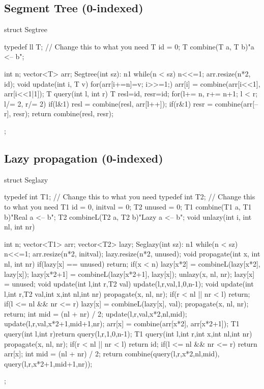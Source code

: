 \subsection{Segment Tree (0-indexed)}
\begin{cpp}
struct Segtree{
  typedef ll T; // Change this to what you need
  T id = 0;
  T combine(T a, T b){"a <-- b";}

  int n; vector<T> arr;
  Segtree(int sz): n{1} {
    while(n < sz) n<<=1; arr.resize(n*2, id);
  }
  void update(int i, T v){
    for(arr[i+=n]=v; i>>=1;)
      arr[i] = combine(arr[i<<1], arr[i<<1|1]);
  }
  T query(int l, int r){
    T resl=id, resr=id;
    for(l+= n, r+= n+1; l < r; l/= 2, r/= 2){
      if(l&1) resl = combine(resl, arr[l++]);
      if(r&1) resr = combine(arr[--r], resr);
    }
    return combine(resl, resr);
  }
};
\end{cpp}

\subsection{Lazy propagation (0-indexed)}
\begin{cpp}
struct Seglazy{
  typedef int T1; // Change this to what you need
  typedef int T2; // Change this to what you need
  T1 id = 0, initval = 0;
  T2 unused = 0;
  T1 combine(T1 a, T1 b){"Real a <-- b";}
  T2 combineL(T2 a, T2 b){"Lazy a <-- b";}
  void unlazy(int i, int nl, int nr){}
  
  int n; vector<T1> arr; vector<T2> lazy;
  Seglazy(int sz): n{1} {
    while(n < sz) n<<=1;
    arr.resize(n*2, initval); lazy.resize(n*2, unused);
  }
  void propagate(int x, int nl, int nr){
    if(lazy[x] == unused) return;
    if(x < n){
      lazy[x*2] = combineL(lazy[x*2], lazy[x]);
      lazy[x*2+1] = combineL(lazy[x*2+1], lazy[x]);
    }
    unlazy(x, nl, nr);
    lazy[x] = unused;
  }
  void update(int l,int r,T2 val)
    {update(l,r,val,1,0,n-1);}
  void update(int l,int r,T2 val,int x,int nl,int nr){
    propagate(x, nl, nr);
    if(r < nl || nr < l) return;
    if(l <= nl && nr <= r){
      lazy[x] = combineL(lazy[x], val);
      propagate(x, nl, nr);
      return;
    }
    int mid = (nl + nr) / 2;
    update(l,r,val,x*2,nl,mid);
    update(l,r,val,x*2+1,mid+1,nr);
    arr[x] = combine(arr[x*2], arr[x*2+1]);
  }
  T1 query(int l,int r){return query(l,r,1,0,n-1);}
  T1 query(int l,int r,int x,int nl,int nr){
    propagate(x, nl, nr);
    if(r < nl || nr < l) return id;
    if(l <= nl && nr <= r) return arr[x];
    int mid = (nl + nr) / 2;
    return combine(query(l,r,x*2,nl,mid),
                   query(l,r,x*2+1,mid+1,nr));
  }
};
\end{cpp}


